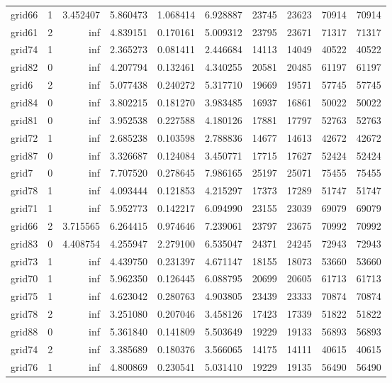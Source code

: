 \begin{longtable}{|l|r|r|r|r|r|r|r|r|r|}
grid66 & 1 & 3.452407 & 5.860473 & 1.068414 & 6.928887 & 23745 & 23623 & 70914 & 70914 \\
grid61 & 2 & inf & 4.839151 & 0.170161 & 5.009312 & 23795 & 23671 & 71317 & 71317 \\
grid74 & 1 & inf & 2.365273 & 0.081411 & 2.446684 & 14113 & 14049 & 40522 & 40522 \\
grid82 & 0 & inf & 4.207794 & 0.132461 & 4.340255 & 20581 & 20485 & 61197 & 61197 \\
grid6 & 2 & inf & 5.077438 & 0.240272 & 5.317710 & 19669 & 19571 & 57745 & 57745 \\
grid84 & 0 & inf & 3.802215 & 0.181270 & 3.983485 & 16937 & 16861 & 50022 & 50022 \\
grid81 & 0 & inf & 3.952538 & 0.227588 & 4.180126 & 17881 & 17797 & 52763 & 52763 \\
grid72 & 1 & inf & 2.685238 & 0.103598 & 2.788836 & 14677 & 14613 & 42672 & 42672 \\
grid87 & 0 & inf & 3.326687 & 0.124084 & 3.450771 & 17715 & 17627 & 52424 & 52424 \\
grid7 & 0 & inf & 7.707520 & 0.278645 & 7.986165 & 25197 & 25071 & 75455 & 75455 \\
grid78 & 1 & inf & 4.093444 & 0.121853 & 4.215297 & 17373 & 17289 & 51747 & 51747 \\
grid71 & 1 & inf & 5.952773 & 0.142217 & 6.094990 & 23155 & 23039 & 69079 & 69079 \\
grid66 & 2 & 3.715565 & 6.264415 & 0.974646 & 7.239061 & 23797 & 23675 & 70992 & 70992 \\
grid83 & 0 & 4.408754 & 4.255947 & 2.279100 & 6.535047 & 24371 & 24245 & 72943 & 72943 \\
grid73 & 1 & inf & 4.439750 & 0.231397 & 4.671147 & 18155 & 18073 & 53660 & 53660 \\
grid70 & 1 & inf & 5.962350 & 0.126445 & 6.088795 & 20699 & 20605 & 61713 & 61713 \\
grid75 & 1 & inf & 4.623042 & 0.280763 & 4.903805 & 23439 & 23333 & 70874 & 70874 \\
grid78 & 2 & inf & 3.251080 & 0.207046 & 3.458126 & 17423 & 17339 & 51822 & 51822 \\
grid88 & 0 & inf & 5.361840 & 0.141809 & 5.503649 & 19229 & 19133 & 56893 & 56893 \\
grid74 & 2 & inf & 3.385689 & 0.180376 & 3.566065 & 14175 & 14111 & 40615 & 40615 \\
grid76 & 1 & inf & 4.800869 & 0.230541 & 5.031410 & 19229 & 19135 & 56490 & 56490 \\

\end{longtable}
